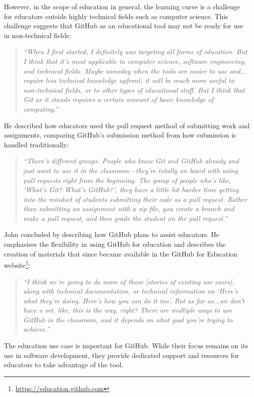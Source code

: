However, in the scope of education in general, the learning curve is a challenge for educators outside highly technical fields such as computer science. This challenge suggests that GitHub as an educational tool may not be ready for use in non-technical fields:
\begin{quote}\textit{``When I first started, I definitely was targeting all forms of education. But I think that it's most applicable in computer science, software engineering, and technical fields. Maybe someday when the tools are easier to use and... require less technical knowledge upfront, it will be much more useful to non-technical fields, or to other types of educational stuff. But I think that Git as it stands requires a certain amount of basic knowledge of computing.''}\end{quote}

He described how educators used the pull request method of submitting work and assignments, comparing GitHub's submission method from how submission is handled traditionally:
\begin{quote}\textit{``There's different groups. People who know Git and GitHub already and just want to use it in the classroom---they're totally on board with using pull requests right from the beginning. The group of people who's like, `What's Git? What's GitHub?', they have a little bit harder time getting into the mindset of students submitting their code as a pull request. Rather than submitting an assignment with a zip file, you create a branch and make a pull request, and then grade the student on the pull request.''}\end{quote}

John concluded by describing how GitHub plans to assist educators. He emphasizes the flexibility in using GitHub for education and describes the creation of materials that since became available in the GitHub for Education website\footnote{\url{https://education.github.com}}:
\begin{quote}\textit{``I think we're going to do more of those [stories of existing use cases], along with technical documentation, or technical information on `Here's what they're doing. Here's how you can do it too'. But as far as...we don't have a set, like, this is the way, right? There are multiple ways to use GitHub in the classroom, and it depends on what goal you're trying to achieve.''}\end{quote}

The education use case is important for GitHub. While their focus remains on its use in software development, they provide dedicated support and resources for educators to take advantage of the tool.

